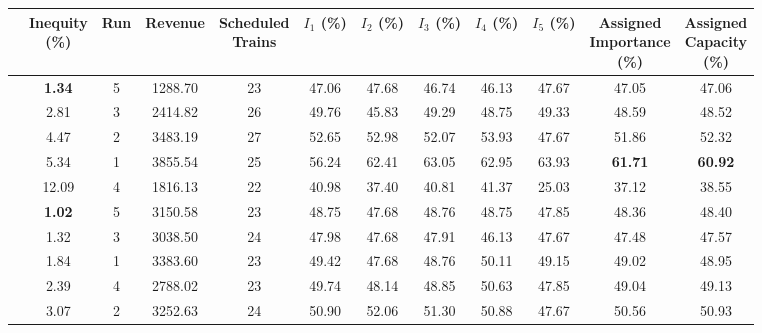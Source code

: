 \documentclass[preprint,12pt]{elsarticle}
\begin{document}
\begin{table}[htbp]
\centering
\begin{adjustbox}{max width=\textwidth}
\begin{tabular}{|c|c|c|c|c|c|c|c|c|c|c|c|}
\cline{2-12}
 \multicolumn{1}{c|}{} & \makecell{\textbf{Inequity} \\ \textbf{(\%)}} & \textbf{Run} & \textbf{Revenue} & \makecell{\textbf{Scheduled} \\ \textbf{Trains}} & \makecell{\textbf{$I_1$} \\ \textbf{(\%)}} & \makecell{\textbf{$I_2$}  \\ \textbf{(\%)}} & \makecell{\textbf{$I_3$}  \\ \textbf{(\%)}} & \makecell{\textbf{$I_4$} \\ \textbf{(\%)}} & \makecell{\textbf{$I_5$} \\ \textbf{(\%)}} & \makecell{\textbf{Assigned} \\ \textbf{Importance} \\ \textbf{(\%)}} & \makecell{\textbf{Assigned} \\ \textbf{Capacity} \\ \textbf{(\%)}} \\ \cline{2-12} \hline

\parbox[t]{2mm}{} &
\textbf{1.34} & 5 & 1288.70 & 23 & 47.06 & 47.68 & 46.74 & 46.13 & 47.67 & 47.05 & 47.06 \\
& 2.81 & 3 & 2414.82 & 26 & 49.76 & 45.83 & 49.29 & 48.75 & 49.33 & 48.59 & 48.52 \\
& 4.47 & 2 & 3483.19 & 27 & 52.65 & 52.98 & 52.07 & 53.93 & 47.67 & 51.86 & 52.32 \\
& 5.34 & 1 & 3855.54 & 25 & 56.24 & 62.41 & 63.05 & 62.95 & 63.93 & \textbf{61.71 }& \textbf{60.92} \\
& 12.09 & 4 & 1816.13 & 22 & 40.98 & 37.40 & 40.81 & 41.37 & 25.03 & 37.12 & 38.55 \\ \hline

\parbox[t]{2mm}{} & \textbf{1.02} & 5 & 3150.58 & 23 & 48.75 & 47.68 & 48.76 & 48.75 & 47.85 & 48.36 & 48.40 \\
& 1.32 & 3 & 3038.50 & 24 & 47.98 & 47.68 & 47.91 & 46.13 & 47.67 & 47.48 & 47.57 \\
& 1.84 & 1 & 3383.60 & 23 & 49.42 & 47.68 & 48.76 & 50.11 & 49.15 & 49.02 & 48.95 \\
& 2.39 & 4 & 2788.02 & 23 & 49.74 & 48.14 & 48.85 & 50.63 & 47.85 & 49.04 & 49.13 \\
& 3.07 & 2 & 3252.63 & 24 & 50.90 & 52.06 & 51.30 & 50.88 & 47.67 & 50.56 & 50.93 \\ \hline


\end{tabular}
\end{adjustbox}
\end{table}
\end{document}

